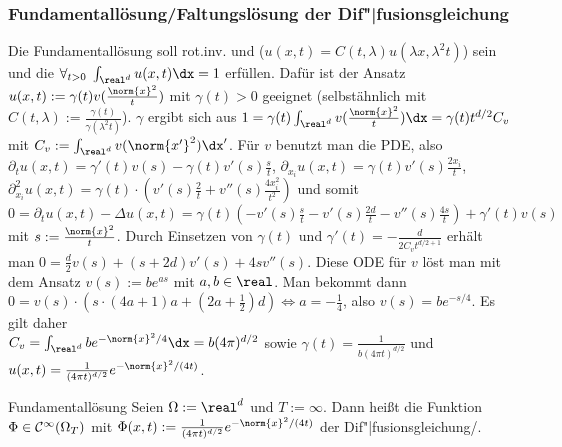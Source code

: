 \subsubsection{%
    Fundamentallösung/Faltungslösung der Dif"|fusionsgleichung%
}

\begin{Bem}
    Die Fundamentallösung soll rot.inv. und 
    ($u(x, t) = C(t, \lambda) u(\lambda x, \lambda^2 t)$) sein und die
     $\forall_{t > 0}\; \int_{\real^d} u(x, t) \dx = 1$ erfüllen.
    Dafür ist der Ansatz $u(x, t) := \gamma(t) v(\frac{\norm{x}^2}{t})$ mit $\gamma(t) > 0$
    geeignet (selbstähnlich mit $C(t, \lambda) := \frac{\gamma(t)}{\gamma(\lambda^2 t)}$).
    $\gamma$ ergibt sich aus
    $1 = \gamma(t) \int_{\real^d} v(\frac{\norm{x}^2}{t}) \dx = \gamma(t) t^{d/2} C_v$ mit
    $C_v := \int_{\real^d} v(\norm{x'}^2) \dx'$.
    Für $v$ benutzt man die PDE, also
    $\partial_t u(x, t) = \gamma'(t) v(s) - \gamma(t) v'(s) \frac{s}{t}$,
    $\partial_{x_i} u(x, t) = \gamma(t) v'(s) \frac{2x_i}{t}$,
    $\partial_{x_i}^2 u(x, t) = \gamma(t) \cdot (v'(s) \frac{2}{t} + v''(s) \frac{4x_i^2}{t^2})$
    und somit $0 = \partial_t u(x, t) - \Delta u(x, t)
    = \gamma(t) (-v'(s) \frac{s}{t} - v'(s) \frac{2d}{t} - v''(s) \frac{4s}{t}) + \gamma'(t) v(s)$
    mit $s := \frac{\norm{x}^2}{t}$.
    Durch Einsetzen von $\gamma(t)$ und $\gamma'(t) = -\frac{d}{2C_v t^{d/2+1}}$ erhält man
    $0 = \frac{d}{2} v(s) + (s + 2d) v'(s) + 4s v''(s)$.
    Diese ODE für $v$ löst man mit dem Ansatz $v(s) := be^{as}$ mit $a, b \in \real$.
    Man bekommt dann $0 = v(s) \cdot (s \cdot (4a + 1)a + (2a + \frac{1}{2})d)
    \iff a = -\frac{1}{4}$, also $v(s) = be^{-s/4}$.
    Es gilt daher\\
    $C_v = \int_{\real^d} be^{-\norm{x}^2/4} \dx = b (4\pi)^{d/2}$ sowie
    $\gamma(t) = \frac{1}{b(4\pi t)^{d/2}}$ und
    $u(x, t) = \frac{1}{(4\pi t)^{d/2}} e^{-\norm{x}^2/(4t)}$.
\end{Bem}

\linie

\begin{Def}{Fundamentallösung}
    Seien $\Omega := \real^d$ und $T := \infty$.
    Dann heißt die Funktion $\Phi \in \mathcal{C}^\infty(\Omega_T)$ mit
    $\Phi(x, t) := \frac{1}{(4\pi t)^{d/2}} e^{-\norm{x}^2/(4t)}$
     der Dif"|fusionsgleichung/.
\end{Def}

